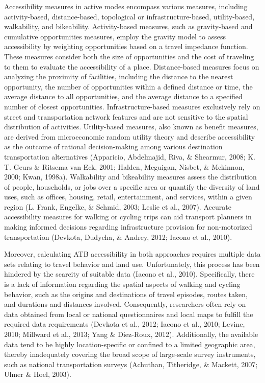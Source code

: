 \documentclass[
11pt, %
oneside, %
english, %
singlespacing, %
]{macthesis} %
\begin{document}
Accessibility measures in active modes encompass various measures, including activity-based, distance-based, topological or infrastructure-based, utility-based, walkability, and bikeability. Activity-based measures, such as gravity-based and cumulative opportunities measures, employ the gravity model to assess accessibility by weighting opportunities based on a travel impedance function. These measures consider both the size of opportunities and the cost of traveling to them to evaluate the accessibility of a place. Distance-based measures focus on analyzing the proximity of facilities, including the distance to the nearest opportunity, the number of opportunities within a defined distance or time, the average distance to all opportunities, and the average distance to a specified number of closest opportunities. Infrastructure-based measures exclusively rely on street and transportation network features and are not sensitive to the spatial distribution of activities. Utility-based measures, also known as benefit measures, are derived from microeconomic random utility theory and describe accessibility as the outcome of rational decision-making among various destination transportation alternatives (Apparicio, Abdelmajid, Riva, \& Shearmur, 2008; K. T. Geurs \& Ritsema van Eck, 2001; Halden, Mcguigan, Nisbet, \& Mckinnon, 2000; Kwan, 1998a). Walkability and bikeability measures assess the distribution of people, households, or jobs over a specific area or quantify the diversity of land uses, such as offices, housing, retail, entertainment, and services, within a given region (L. Frank, Engelke, \& Schmid, 2003; Leslie et al., 2007). Accurate accessibility measures for walking or cycling trips can aid transport planners in making informed decisions regarding infrastructure provision for non-motorized transportation (Devkota, Dudycha, \& Andrey, 2012; Iacono et al., 2010).

Moreover, calculating ATB accessibility in both approaches requires multiple data sets relating to travel behavior and land use. Unfortunately, this process has been hindered by the scarcity of suitable data (Iacono et al., 2010). Specifically, there is a lack of information regarding the spatial aspects of walking and cycling behavior, such as the origins and destinations of travel episodes, routes taken, and durations and distances involved. Consequently, researchers often rely on data obtained from local or national questionnaires and local maps to fulfill the required data requirements (Devkota et al., 2012; Iacono et al., 2010; Levine, 2010; Millward et al., 2013; Yang \& Diez-Roux, 2012). Additionally, the available data tend to be highly location-specific or confined to a limited geographic area, thereby inadequately covering the broad scope of large-scale survey instruments, such as national transportation surveys (Achuthan, Titheridge, \& Mackett, 2007; Ulmer \& Hoel, 2003).
\end{document}
